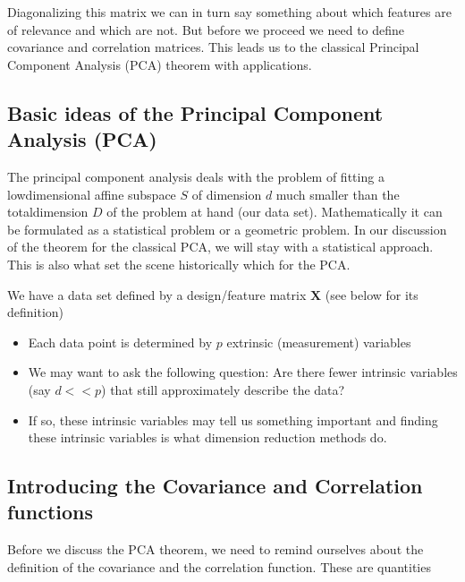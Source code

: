 \documentclass[letterpaper,10pt,english]{sphinxmanual}
\begin{document}
Diagonalizing this matrix we can in turn say something about which
features are of relevance and which are not. But before we proceed we
need to define covariance and correlation matrices. This leads us to
the classical Principal Component Analysis (PCA) theorem with
applications.


\subsection{Basic ideas of the Principal Component Analysis (PCA)}
\label{\detokenize{chapter8:basic-ideas-of-the-principal-component-analysis-pca}}
The principal component analysis deals with the problem of fitting a
low\sphinxhyphen{}dimensional affine subspace \(S\) of dimension \(d\) much smaller than
the totaldimension \(D\) of the problem at hand (our data
set). Mathematically it can be formulated as a statistical problem or
a geometric problem.  In our discussion of the theorem for the
classical PCA, we will stay with a statistical approach. This is also
what set the scene historically which for the PCA.

We have a data set defined by a design/feature matrix \(\boldsymbol{X}\) (see below for its definition)
\begin{itemize}
\item {} 
Each data point is determined by \(p\) extrinsic (measurement) variables

\item {} 
We may want to ask the following question: Are there fewer intrinsic variables (say \(d << p\)) that still approximately describe the data?

\item {} 
If so, these intrinsic variables may tell us something important and finding these intrinsic variables is what dimension reduction methods do.

\end{itemize}


\subsection{Introducing the Covariance and Correlation functions}
\label{\detokenize{chapter8:introducing-the-covariance-and-correlation-functions}}
Before we discuss the PCA theorem, we need to remind ourselves about
the definition of the covariance and the correlation function. These are quantities
\end{document}
